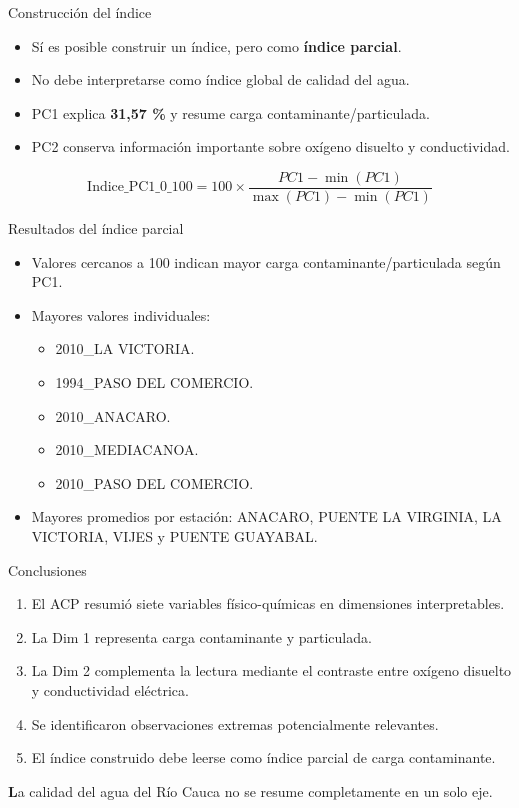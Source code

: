 \documentclass[aspectratio=169,11pt]{beamer}
\begin{document}
\begin{frame}{Construcción del índice}
  \begin{itemize}
    \item Sí es posible construir un índice, pero como \textbf{índice parcial}.
    \item No debe interpretarse como índice global de calidad del agua.
    \item PC1 explica \textbf{31,57 \%} y resume carga contaminante/particulada.
    \item PC2 conserva información importante sobre oxígeno disuelto y conductividad.
  \end{itemize}

  \[
    \text{Indice\_PC1\_0\_100} =
    100 \times \frac{PC1 - \min(PC1)}{\max(PC1) - \min(PC1)}
  \]
\end{frame}

\begin{frame}{Resultados del índice parcial}
  \begin{itemize}
    \item Valores cercanos a 100 indican mayor carga contaminante/particulada según PC1.
    \item Mayores valores individuales:
      \begin{itemize}
        \item 2010\_LA VICTORIA.
        \item 1994\_PASO DEL COMERCIO.
        \item 2010\_ANACARO.
        \item 2010\_MEDIACANOA.
        \item 2010\_PASO DEL COMERCIO.
      \end{itemize}
    \item Mayores promedios por estación: ANACARO, PUENTE LA VIRGINIA, LA VICTORIA, VIJES y PUENTE GUAYABAL.
  \end{itemize}
\end{frame}

\begin{frame}{Conclusiones}
  \begin{enumerate}
    \item El ACP resumió siete variables físico-químicas en dimensiones interpretables.
    \item La Dim 1 representa carga contaminante y particulada.
    \item La Dim 2 complementa la lectura mediante el contraste entre oxígeno disuelto y conductividad eléctrica.
    \item Se identificaron observaciones extremas potencialmente relevantes.
    \item El índice construido debe leerse como índice parcial de carga contaminante.
  \end{enumerate}

  \vspace{0.3cm}
  \textbf La calidad del agua del Río Cauca no se resume completamente en un solo eje.
\end{frame}
\end{document}
